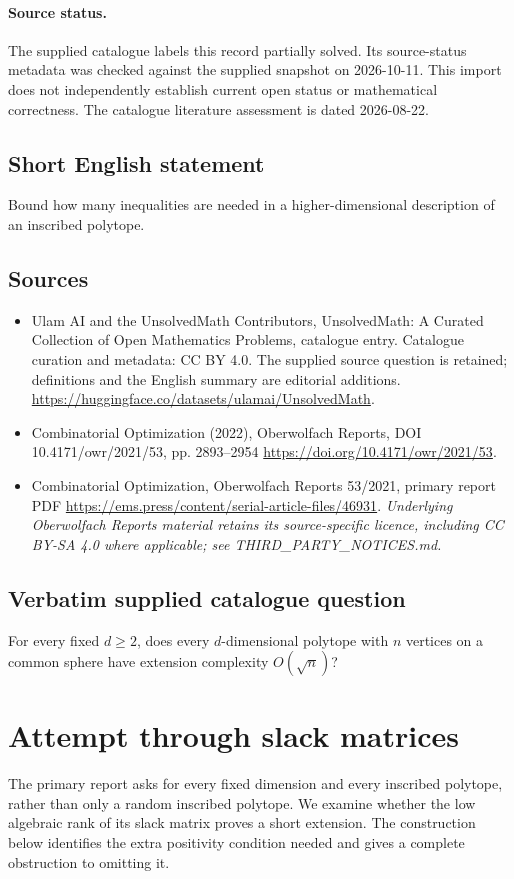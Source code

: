 \documentclass[11pt]{article}
\begin{document}
\paragraph{Source status.}
The supplied catalogue labels this record partially solved. Its source-status metadata was checked against the supplied snapshot on 2026-10-11. This import does not independently establish current open status or mathematical correctness. The catalogue literature assessment is dated 2026-08-22.
\subsection{Short English statement}
Bound how many inequalities are needed in a higher-dimensional description of an inscribed polytope.
\subsection{Sources}
\begin{itemize}
\item[S1] Ulam AI and the UnsolvedMath Contributors, UnsolvedMath: A Curated Collection of Open Mathematics Problems, catalogue entry. Catalogue curation and metadata: CC BY 4.0. The supplied source question is retained; definitions and the English summary are editorial additions.
\url{https://huggingface.co/datasets/ulamai/UnsolvedMath}.
\item[S2] Combinatorial Optimization (2022), Oberwolfach Reports, DOI 10.4171/owr/2021/53, pp. 2893--2954
\url{https://doi.org/10.4171/owr/2021/53}.
\item[S3] Combinatorial Optimization, Oberwolfach Reports 53/2021, primary report PDF
\url{https://ems.press/content/serial-article-files/46931}.
\textit{Underlying Oberwolfach Reports material retains its source-specific licence, including CC BY-SA 4.0 where applicable; see THIRD\_PARTY\_NOTICES.md.}
\end{itemize}
\subsection{Verbatim supplied catalogue question}
For every fixed $d\geq2$, does every $d$-dimensional polytope with $n$ vertices on a common sphere have extension complexity $O(\sqrt n)$?

\section{Attempt through slack matrices}
The primary report asks for every fixed dimension and every inscribed
polytope, rather than only a random inscribed polytope. We examine
whether the low algebraic rank of its slack matrix proves a short
extension. The construction below identifies the extra positivity
condition needed and gives a complete obstruction to omitting it.
\end{document}

